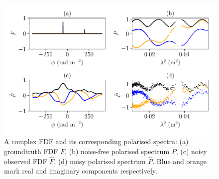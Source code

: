     \begin{figure}
      \includegraphics[width=\linewidth]{faraday-images/spectra.pdf}
      \caption{A complex FDF and its corresponding polarised spectra: (a) groundtruth FDF $F$, (b) noise-free polarised spectrum $P$, (c) noisy observed FDF $\hat F$, (d) noisy polarised spectrum $\hat P$. Blue and orange mark real and imaginary components respectively.}
      \label{fig:complex-fdf}
    \end{figure}

